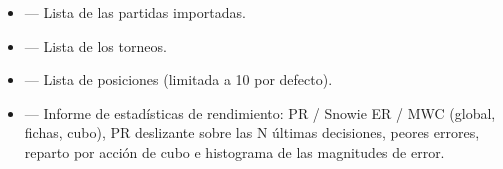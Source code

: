 \documentclass[letterpaper,10pt,spanish]{sphinxmanual}
\begin{document}
\sphinxAtStartPar
{}
\begin{itemize}
\item {} 
\sphinxAtStartPar
{} — Lista de las partidas importadas.

\item {} 
\sphinxAtStartPar
{} — Lista de los torneos.

\item {} 
\sphinxAtStartPar
{} — Lista de posiciones (limitada a 10 por defecto).

\item {} 
\sphinxAtStartPar
{} — Informe de estadísticas de rendimiento: PR / Snowie ER / MWC (global, fichas, cubo), PR deslizante sobre las N últimas decisiones, peores errores, reparto por acción de cubo e histograma de las magnitudes de error.

\end{itemize}
\end{document}
